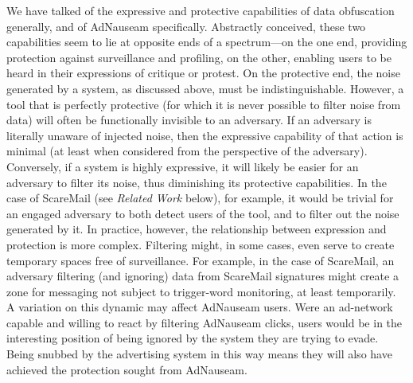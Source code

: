 \documentclass[conference]{IEEEtran}
\begin{document}
We have talked of the expressive and protective capabilities of data obfuscation generally, and of AdNauseam specifically. Abstractly conceived, these two capabilities seem to lie at opposite ends of a spectrum---on the one end, providing protection against surveillance and profiling, on the other, enabling users to be heard in their expressions of critique or protest. On the protective end, the noise generated by a system, as discussed above, must be indistinguishable. However, a tool that is perfectly protective (for which it is never possible to filter noise from data) will often be functionally invisible to an adversary. If an adversary is literally unaware of injected noise, then the expressive capability of that action is minimal (at least when considered from the perspective of the adversary). Conversely, if a system is highly expressive, it will likely be easier for an adversary to filter its noise, thus diminishing its protective capabilities. In the case of ScareMail (see \emph{Related Work} below), for example, it would be trivial for an engaged adversary to both detect users of the tool, and to filter out the noise generated by it. In practice, however, the relationship between expression and protection is more complex. Filtering might, in some cases, even serve to create temporary spaces free of surveillance. For example, in the case of ScareMail, an adversary filtering (and ignoring) data from ScareMail signatures might create a zone for messaging not subject to trigger-word monitoring, at least temporarily. A variation on this dynamic may affect AdNauseam users. Were an ad-network capable and willing to react by filtering AdNauseam clicks, users would be in the interesting position of being ignored by the system they are trying to evade. Being snubbed by the advertising system in this way means they will also have achieved the protection sought from AdNauseam.
\end{document}
